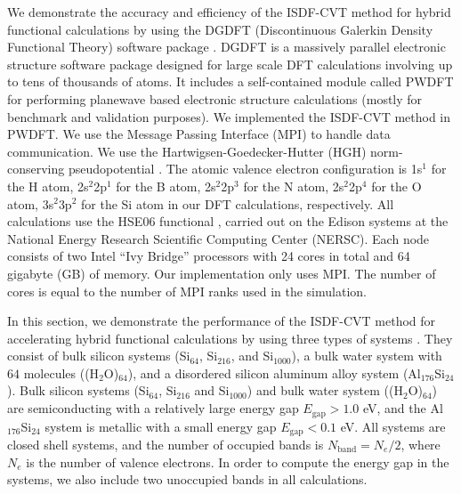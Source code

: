 We demonstrate the accuracy and efficiency of the ISDF\hyp{}CVT method for
hybrid functional calculations by using the DGDFT (Discontinuous Galerkin
Density Functional Theory) software package \cite{JCP_231_2140_2012_DGDFT,
JCP_143_124110_2015_DGDFT,PCCP_17_31397_2015_DGDFT, JCP_145_154101_2016_DGDFT,
JCP_335_426_2017_DGDFT}. DGDFT is a massively parallel electronic structure
software package designed for large scale DFT calculations involving up to tens
of thousands of atoms. It includes a self\hyp{}contained module called PWDFT for
performing planewave based electronic structure calculations (mostly for
benchmark and validation purposes). We implemented the ISDF\hyp{}CVT method in
PWDFT. We use the Message Passing Interface (MPI) to handle data communication.
We use the Hartwigsen\hyp{}Goedecker\hyp{}Hutter (HGH) norm\hyp{}conserving
pseudopotential \cite{PRB_58_3641_1998_HGH}. The atomic valence electron
configuration is 1s$^1$ for the H atom, 2s$^2$2p$^1$ for the B atom,
2s$^2$2p$^3$ for the N atom, 2s$^2$2p$^4$ for the O atom, 3s$^2$3p$^2$ for the
Si atom in our DFT calculations, respectively. All calculations use the HSE06
functional \cite{JCP_124_219906_2006_HSE06}, carried out on the Edison systems
at the National Energy Research Scientific Computing Center (NERSC). Each node
consists of two Intel ``Ivy Bridge'' processors with 24 cores in total and 64
gigabyte (GB) of memory. Our implementation only uses MPI. The number of cores
is equal to the number of MPI ranks used in the simulation.

In this section, we demonstrate the performance of the ISDF\hyp{}CVT method for
accelerating hybrid functional calculations by using three types of systems 
\cite{JCTC_2017_PCDIIS}. They consist of bulk silicon systems (Si$_{64}$, Si$_
{216}$, and Si$_{1000}$), a bulk water system with $64$ molecules ((H$_2$O)$_
{64}$), and a disordered silicon aluminum alloy system (Al$_{176}$Si$_{24}$).
Bulk silicon systems (Si$_{64}$, Si$_{216}$ and Si$_{1000}$) and bulk water
system ((H$_2$O)$_{64}$) are semiconducting with a relatively large energy gap
$E_\text{gap} > 1.0$ eV, and the Al$_{176}$Si$_{24}$ system is metallic with a
small energy gap $E_\text{gap} < 0.1$ eV. All systems are closed shell systems,
and the number of occupied bands is $N_\text{band} = N_{e}/2$, where $N_e$ is
the number of valence electrons. In order to compute the energy gap in the
systems, we also include two unoccupied bands in all calculations.


\subsection{}
\label{c5subsec:accuracy}

